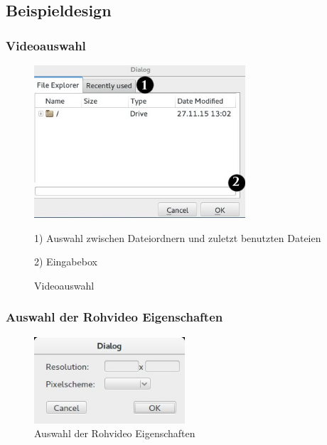 \documentclass[parskip=full]{scrartcl}
\begin{document}
\subsection{Beispieldesign}

\subsubsection{Videoauswahl}
\begin{figure}[htbp] 
\centering
\includegraphics[width=0.7\textwidth]{ToViET/Screenshots/Fileselector.jpg}
\caption{Videoauswahl}
\begin{flushleft}
\item 1) Auswahl zwischen Dateiordnern und zuletzt benutzten Dateien
\item 2) Eingabebox 

\end{flushleft}
\end{figure}
\subsubsection{Auswahl der Rohvideo Eigenschaften}
\begin{figure}[htbp] 
\centering
\includegraphics[width=0.5\textwidth]{ToViET/Screenshots/RawVidProperties.jpg}
\caption{Auswahl der Rohvideo Eigenschaften}

\end{figure}
\newpage
\end{document}
